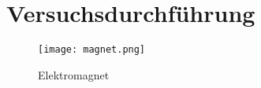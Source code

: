 \section{Versuchsdurchführung}

\begin{figure}
    \centering
    \texttt{[image: magnet.png]}
    \caption{Elektromagnet}
    \label{fig:emagnet}
  \end{figure}

  